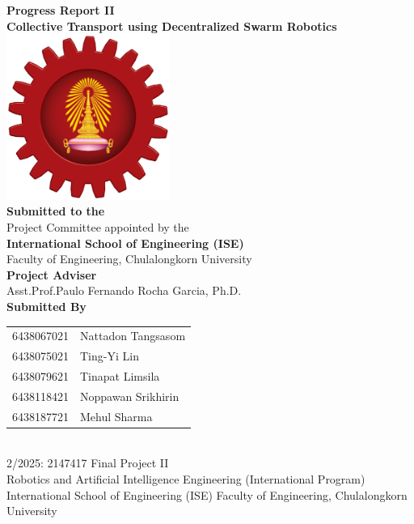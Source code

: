 \begin{titlepage}
    \centering

    {\LARGE \textbf{Progress Report II}}\\[1cm]
    {\Huge \textbf{Collective Transport using Decentralized Swarm Robotics}}\\[1cm]

    \includegraphics[width=0.4\textwidth]{assets/images/ise_logo.png}\\[1cm]
    
    \textbf{Submitted to the}\\[0.1cm]
    Project Committee appointed by the\\
    \textbf{International School of Engineering (ISE)}\\
    Faculty of Engineering, Chulalongkorn University\\[1cm]

    \textbf{Project Adviser}\\[0.1cm]
    Asst.Prof.Paulo Fernando Rocha Garcia, Ph.D.\\[1cm]

    \textbf{Submitted By}\\[0.5cm]
    \begin{tabular}{rl}
        6438067021 & Nattadon Tangsasom \\
        6438075021 & Ting-Yi Lin \\
        6438079621 & Tinapat Limsila \\
        6438118421 & Noppawan Srikhirin \\
        6438187721 & Mehul Sharma \\
    \end{tabular}\\[1cm]
    2/2025: 2147417 Final Project II\\
    Robotics and Artificial Intelligence Engineering (International Program)\\
    International School of Engineering (ISE) Faculty of Engineering, Chulalongkorn University

\end{titlepage}
